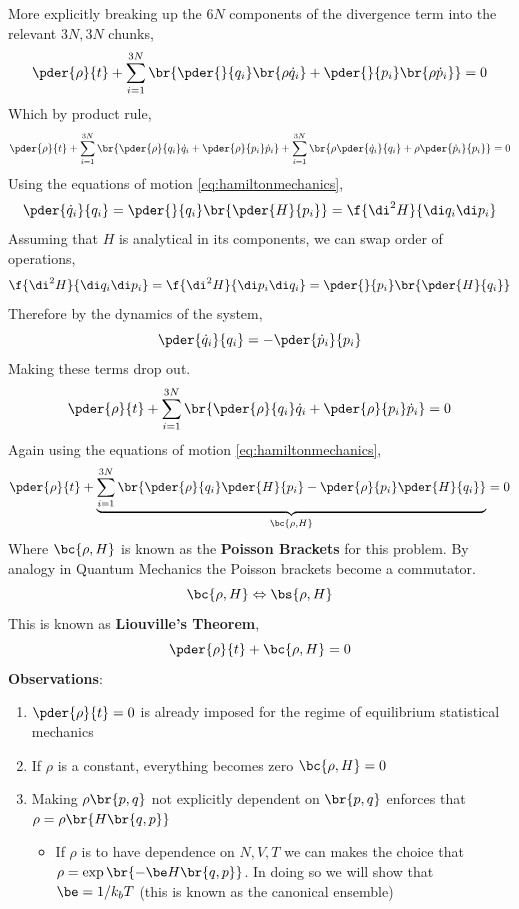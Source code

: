 \documentclass{article}
\begin{document}
More explicitly breaking up the $6N$ components of the divergence term into the relevant $3N,3N$ chunks,
\[ \pder{\rho}{t} + \sum_{i=1}^{3N} \br{\pder{}{q_i} \br{\rho \dot{q}_i} + \pder{}{p_i}\br{\rho \dot{p}_i}} = 0 \]
Which by product rule,
\[ \pder{\rho}{t} + \sum_{i=1}^{3N} \br{\pder{\rho}{q_i} \dot{q}_i + \pder{\rho}{p_i} \dot{p}_i} + \sum_{i=1}^{3N} \br{\rho\pder{\dot{q}_i}{q_i} + \rho\pder{\dot{p}_i}{p_i} } = 0 \]
Using the equations of motion \eqref{eq:hamiltonmechanics},
\[ \pder{\dot{q}_i}{q_i} = \pder{}{q_i} \br{\pder{H}{p_i}} = \f{\di^2H}{\di q_i \di p_i} \]
Assuming that $H$ is analytical in its components, we can swap order of operations,
\[ \f{\di^2H}{\di q_i \di p_i} = \f{\di^2H}{\di p_i \di q_i} = \pder{}{p_i} \br{\pder{H}{q_i}}\]
Therefore by the dynamics of the system,
\[ \pder{\dot{q}_i}{q_i} = -\pder{\dot{p}_i}{p_i} \]
Making these terms drop out.
\[ \pder{\rho}{t} + \sum_{i=1}^{3N} \br{\pder{\rho}{q_i} \dot{q}_i + \pder{\rho}{p_i} \dot{p}_i} = 0 \]
Again using the equations of motion \eqref{eq:hamiltonmechanics},
\[ \pder{\rho}{t} + \underbrace{\sum_{i=1}^{3N} \br{\pder{\rho}{q_i} \pder{H}{p_i} - \pder{\rho}{p_i} \pder{H}{q_i}}}_{\bc{\rho, H}} = 0 \]
Where $\bc{\rho, H}$ is known as the \textbf{Poisson Brackets} for this problem. By analogy in Quantum Mechanics the Poisson brackets become a commutator.
\[ \bc{\rho, H} \Leftrightarrow \bs{\rho, H} \]
This is known as \textbf{Liouville's Theorem},
\[ \pder{\rho}{t} + \bc{\rho, H} = 0 \]
\textbf{Observations}:
\begin{enumerate}
    \item $\pder{\rho}{t} = 0$ is already imposed for the regime of equilibrium statistical mechanics
    \item If $\rho$ is a constant, everything becomes zero $\bc{\rho, H} = 0$
    \item Making $\rho\br{p,q}$ not explicitly dependent on $\br{p,q}$ enforces that $\rho = \rho\br{H\br{q,p}}$
    \begin{itemize}
        \item If $\rho$ is to have dependence on $N,V,T$ we can makes the choice that $\rho = \exp\br{-\be H\br{q,p}}$. In doing so we will show that $\be = 1/k_bT$ (this is known as the canonical ensemble)
    \end{itemize}
\end{enumerate}
\end{document}
